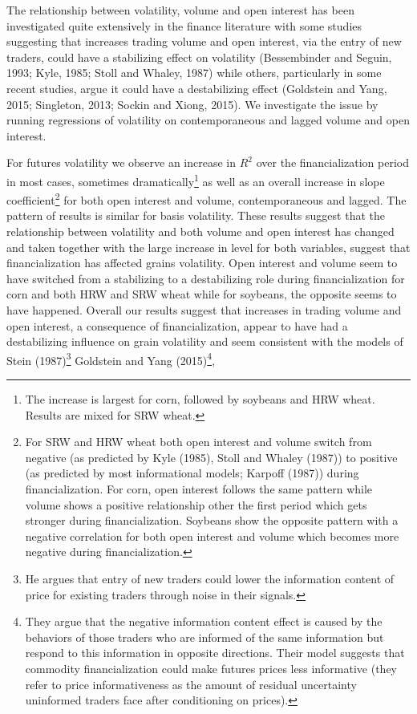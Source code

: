 \documentclass[]{elsarticle} %
\begin{document}
The relationship between volatility, volume and open interest has been
investigated quite extensively in the finance literature with some
studies suggesting that increases trading volume and open interest, via
the entry of new traders, could have a stabilizing effect on volatility
(Bessembinder and Seguin, 1993; Kyle, 1985; Stoll and Whaley, 1987)
while others, particularly in some recent studies, argue it could have a
destabilizing effect (Goldstein and Yang, 2015; Singleton, 2013; Sockin
and Xiong, 2015). We investigate the issue by running regressions of
volatility on contemporaneous and lagged volume and open interest.

For futures volatility we observe an increase in \(R^{2}\) over the
financialization period in most cases, sometimes dramatically\footnote{The
  increase is largest for corn, followed by soybeans and HRW wheat.
  Results are mixed for SRW wheat.} as well as an overall increase in
slope coefficient\footnote{For SRW and HRW wheat both open interest and
  volume switch from negative (as predicted by Kyle (1985), Stoll and
  Whaley (1987)) to positive (as predicted by most informational models;
  Karpoff (1987)) during financialization. For corn, open interest
  follows the same pattern while volume shows a positive relationship
  other the first period which gets stronger during financialization.
  Soybeans show the opposite pattern with a negative correlation for
  both open interest and volume which becomes more negative during
  financialization.} for both open interest and volume, contemporaneous
and lagged. The pattern of results is similar for basis volatility.
These results suggest that the relationship between volatility and both
volume and open interest has changed and taken together with the large
increase in level for both variables, suggest that financialization has
affected grains volatility. Open interest and volume seem to have
switched from a stabilizing to a destabilizing role during
financialization for corn and both HRW and SRW wheat while for soybeans,
the opposite seems to have happened. Overall our results suggest that
increases in trading volume and open interest, a consequence of
financialization, appear to have had a destabilizing influence on grain
volatility and seem consistent with the models of Stein (1987)\footnote{He
  argues that entry of new traders could lower the information content
  of price for existing traders through noise in their signals.}
Goldstein and Yang (2015)\footnote{They argue that the negative
  information content effect is caused by the behaviors of those traders
  who are informed of the same information but respond to this
  information in opposite directions. Their model suggests that
  commodity financialization could make futures prices less informative
  (they refer to price informativeness as the amount of residual
  uncertainty uninformed traders face after conditioning on prices).},
\end{document}
